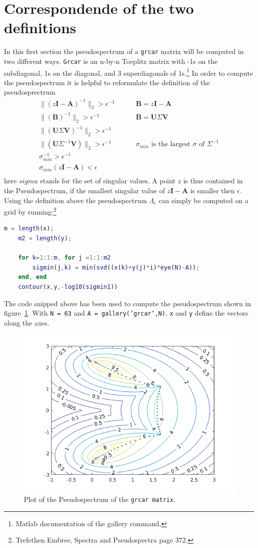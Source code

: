 \section{Correspondende of the two definitions}
In this first section the pseudospectrum of a \texttt{grcar} matrix will be computed in two different ways. \texttt{Grcar} is an n-by-n Toeplitz matrix with -1s on the subdiagonal, 1s on the diagonal, and 3 superdiagonals of 1s.\footnote{Matlab documentation of the gallery command.} In order to compute the pseudospectrum it is helpful to reformulate the definition of the pseudosprectrum
\begin{align}
\| (z\mathbf{I} - \mathbf{A})^{-1} \|_2 > \epsilon^{-1} & \;\;\;\;\;\;\;\; \mathbf{B} = z\mathbf{I} - \mathbf{A}      \\
\| (\mathbf{B})^{-1} \|_2 > \epsilon^{-1}               & \;\;\;\;\;\;\;\; \mathbf{B} = \mathbf{U} \Sigma \mathbf{V}  \\
\| (\mathbf{U} \Sigma \mathbf{V})^{-1} \|_2 > \epsilon^{-1} \\
\| (\mathbf{U} \Sigma^{-1} \mathbf{V}) \|_2 > \epsilon^{-1} & \;\;\;\;\;\;\;\; \text{$\sigma_{min}$ is the largest $\sigma$ of $\Sigma^{-1}$}  \\
\sigma_{min}^{-1} > \epsilon^{-1} \\
\sigma_{min}(z\mathbf{I} - \mathbf{A}) < \epsilon \\
\end{align}
here $sigma$ stands for the set of singular values. A point $z$ is thus contained in the Pseudospectrum, if the smallest singular value of $z\mathbf{I} - \mathbf{A}$ is smaller then $\epsilon$. Using the definition above the pseudospectrum $\Lambda_\epsilon$ can simply be computed on a grid by running:\footnote{Trefethen Embree, Spectra and Pseudospectra page 372.}
\begin{lstlisting}[language = matlab]
	m = length(x);
	m2 = length(y);	

	for k=1:1:m, for j =1:1:m2
		sigmin(j,k) = min(svd((x(k)+y(j)*i)*eye(N)-A));
	end, end
	contour(x,y,-log10(sigmin1))
\end{lstlisting}
The code snipped above has been used to compute the pseudospectrum shown in figure~\ref{fig:pseudoGrcar}. With \texttt{N = 63} and \texttt{A = gallery('grcar',N)}, \texttt{x} and \texttt{y} define the vectors along the axes. 
\begin{figure}
\centering
\includegraphics[width=0.7\linewidth]{../src/figures/grcar}
\caption{Plot of the Pseudospectrum of the \texttt{grcar matrix}.}
\label{fig:pseudoGrcar}
\end{figure}

